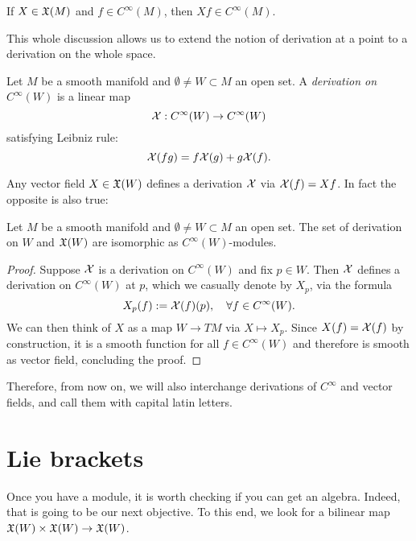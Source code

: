 \begin{exercise}
  If $X\in\mathfrak{X}(M)$ and $f\in C^\infty(M)$, then $Xf\in C^\infty(M)$.
\end{exercise}

This whole discussion allows us to extend the notion of derivation at a point to a derivation on the whole space.
\begin{definition}
  Let $M$ be a smooth manifold and $\emptyset\neq W\subset M$ an open set.
  A \emph{derivation on $C^\infty(W)$} is a linear map
  \begin{equation}
    \mathcal{X}:C^\infty(W)\to C^\infty(W)
  \end{equation}
  satisfying Leibniz rule:
  \begin{equation}
    \mathcal{X}(fg) = f \mathcal{X}(g) + g \mathcal{X}(f).
  \end{equation}
\end{definition}

Any vector field $X\in\mathfrak{X}(W)$ defines a derivation $\mathcal{X}$ via $\mathcal{X}(f) = Xf$. In fact the opposite is also true:
\begin{proposition}
  Let $M$ be a smooth manifold and $\emptyset\neq W\subset M$ an open set.
  The set of derivation on $W$ and $\mathfrak{X}(W)$ are isomorphic as $C^\infty(W)$-modules.
\end{proposition}
\begin{proof}
  Suppose $\mathcal{X}$ is a derivation on $C^\infty(W)$ and fix $p\in W$. Then $\mathcal{X}$ defines a derivation on $C^\infty(W)$ at $p$, which we casually denote by $X_p$, via the formula
  \begin{equation}
    X_p(f) := \mathcal{X}(f)(p), \quad\forall f\in C^\infty(W).
  \end{equation}
  We can then think of $X$ as a map $W\to TM$ via $X\mapsto X_p$.
  Since $X(f)=\mathcal{X}(f)$ by construction, it is a smooth function for all $f\in C^\infty(W)$ and therefore is smooth as vector field, concluding the proof.
\end{proof}

Therefore, from now on, we will also interchange derivations of $C^\infty$ and vector fields, and call them with capital latin letters.

\section{Lie brackets}

Once you have a module, it is worth checking if you can get an algebra.
Indeed, that is going to be our next objective.
To this end, we look for a bilinear map $\mathfrak{X}(W)\times\mathfrak{X}(W) \to \mathfrak{X}(W)$.

